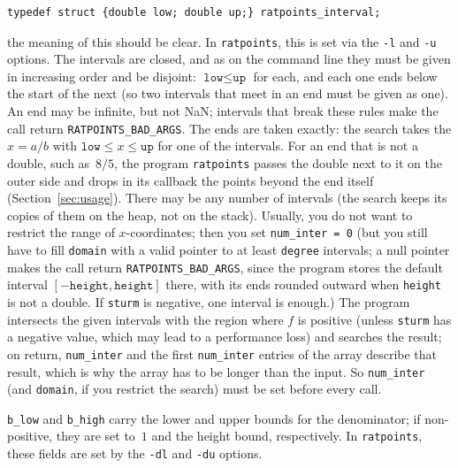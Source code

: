 \documentclass[12pt,a4paper,oneside]{amsart}
\begin{document}
\begin{verbatim}
typedef struct {double low; double up;} ratpoints_interval;
\end{verbatim}

the meaning of this should be clear. In \texttt{ratpoints}, this is set
via the \verb+-l+ and \verb+-u+ options. The intervals are closed, and as on
the command line they must be given in increasing order and be disjoint:
$\texttt{low} \le \texttt{up}$ for each, and each one ends below the start
of the next (so two intervals that meet in an end must be given as one).
An end may be infinite, but not NaN; intervals that break these rules make
the call return \texttt{RATPOINTS\_BAD\_ARGS}. The ends are taken exactly:
the search takes the $x = a/b$ with $\texttt{low} \le x \le \texttt{up}$ for
one of the intervals. For an end that is not a double, such as~$8/5$, the
program \texttt{ratpoints} passes the double next to it on the outer side
and drops in its callback the points beyond the end itself
(Section~\ref{sec:usage}). There may be any number of intervals (the
search keeps its copies of them on the heap, not on the stack).
Usually, you do not want to
restrict the range of $x$-coordinates; then you set \texttt{num\_inter = 0}
(but you still have to fill \texttt{domain} with a valid pointer to at least
\texttt{degree} intervals; a null pointer makes the call return
\texttt{RATPOINTS\_BAD\_ARGS}, since the program stores the default
interval $[-\texttt{height}, \texttt{height}]$ there, with its ends rounded
outward when \texttt{height} is not a double. If \texttt{sturm} is
negative, one interval is enough.)
The program intersects the given intervals with the region where $f$ is
positive (unless \texttt{sturm} has a negative value, which may lead to a
performance loss) and searches the result; on return, \texttt{num\_inter}
and the first \texttt{num\_inter} entries of the array describe that
result, which is why the array has to be longer than the input. So
\texttt{num\_inter} (and \texttt{domain}, if you restrict the search) must
be set before every call.

\texttt{b\_low} and \texttt{b\_high}
carry the lower and upper bounds for the denominator; if non-positive, they are
set to~$1$ and the height bound, respectively. In \texttt{ratpoints}, these
fields are set by the \verb+-dl+ and \verb+-du+ options.
\end{document}
